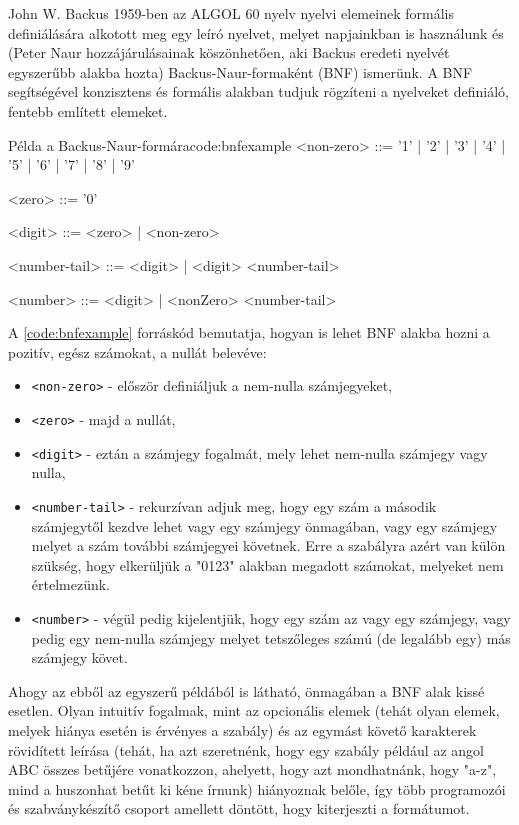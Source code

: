 John W. Backus 1959-ben az ALGOL 60 nyelv nyelvi elemeinek formális definiálására alkotott meg egy leíró nyelvet\cite{bnf}, melyet napjainkban is használunk és (Peter Naur hozzájárulásainak köszönhetően, aki Backus eredeti nyelvét egyszerűbb alakba hozta) Backus-Naur-formaként (BNF) ismerünk. A BNF segítségével konzisztens és formális alakban tudjuk rögzíteni a nyelveket definiáló, fentebb említett elemeket.

\begin{code}{Példa a Backus-Naur-formára}{code:bnfexample}
<non-zero> ::= '1' | '2' | '3' 
             | '4' | '5' | '6' 
             | '7' | '8' | '9'

<zero> ::= '0'

<digit> ::= <zero> | <non-zero>

<number-tail> ::= <digit> | <digit> <number-tail>

<number> ::= <digit> | <nonZero> <number-tail> 
\end{code}

A \ref{code:bnfexample} forráskód bemutatja, hogyan is lehet BNF alakba hozni a pozitív, egész számokat, a nullát belevéve: 

\begin{itemize}
  \item \texttt{<non-zero>} - először definiáljuk a nem-nulla számjegyeket,
  \item \texttt{<zero>} - majd a nullát, 
  \item \texttt{<digit>} - eztán a számjegy fogalmát, mely lehet nem-nulla számjegy vagy nulla,
  \item \texttt{<number-tail>} - rekurzívan adjuk meg, hogy egy szám a második számjegytől kezdve lehet vagy egy számjegy önmagában, vagy egy számjegy melyet a szám további számjegyei követnek. Erre a szabályra azért van külön szükség, hogy elkerüljük a "0123" alakban megadott számokat, melyeket nem értelmezünk.
  \item \texttt{<number>} - végül pedig kijelentjük, hogy egy szám az vagy egy számjegy, vagy pedig egy nem-nulla számjegy melyet tetszőleges számú (de legalább egy) más számjegy követ.
\end{itemize}

Ahogy az ebből az egyszerű példából is látható, önmagában a BNF alak kissé esetlen. Olyan intuitív fogalmak, mint az opcionális elemek (tehát olyan elemek, melyek hiánya esetén is érvényes a szabály) és az egymást követő karakterek rövidített leírása (tehát, ha azt szeretnénk, hogy egy szabály például az angol ABC összes betűjére vonatkozzon, ahelyett, hogy azt mondhatnánk, hogy "a-z", mind a huszonhat betűt ki kéne írnunk) hiányoznak belőle, így több programozói és szabványkészítő csoport amellett döntött, hogy kiterjeszti a formátumot.

